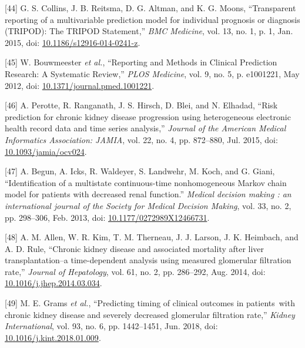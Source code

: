 \documentclass[12pt,PhD,twoside,openright]{muthesis}
\newenvironment{cslreferences}%
  {}%
  {\par}
\begin{document}
\begin{cslreferences}
\leavevmode\hypertarget{ref-collins_transparent_2015}{}%
{[}44{]} G. S. Collins, J. B. Reitsma, D. G. Altman, and K. G. Moons, ``Transparent reporting of a multivariable prediction model for individual prognosis or diagnosis (TRIPOD): The TRIPOD Statement,'' \emph{BMC Medicine}, vol. 13, no. 1, p. 1, Jan. 2015, doi: \href{https://doi.org/10.1186/s12916-014-0241-z}{10.1186/s12916-014-0241-z}.

\leavevmode\hypertarget{ref-bouwmeester_reporting_2012-1}{}%
{[}45{]} W. Bouwmeester \emph{et al.}, ``Reporting and Methods in Clinical Prediction Research: A Systematic Review,'' \emph{PLOS Medicine}, vol. 9, no. 5, p. e1001221, May 2012, doi: \href{https://doi.org/10.1371/journal.pmed.1001221}{10.1371/journal.pmed.1001221}.

\leavevmode\hypertarget{ref-perotte_risk_2015}{}%
{[}46{]} A. Perotte, R. Ranganath, J. S. Hirsch, D. Blei, and N. Elhadad, ``Risk prediction for chronic kidney disease progression using heterogeneous electronic health record data and time series analysis,'' \emph{Journal of the American Medical Informatics Association: JAMIA}, vol. 22, no. 4, pp. 872--880, Jul. 2015, doi: \href{https://doi.org/10.1093/jamia/ocv024}{10.1093/jamia/ocv024}.

\leavevmode\hypertarget{ref-begun_identification_2013}{}%
{[}47{]} A. Begun, A. Icks, R. Waldeyer, S. Landwehr, M. Koch, and G. Giani, ``Identification of a multistate continuous-time nonhomogeneous Markov chain model for patients with decreased renal function.'' \emph{Medical decision making : an international journal of the Society for Medical Decision Making}, vol. 33, no. 2, pp. 298--306, Feb. 2013, doi: \href{https://doi.org/10.1177/0272989X12466731}{10.1177/0272989X12466731}.

\leavevmode\hypertarget{ref-allen_chronic_2014}{}%
{[}48{]} A. M. Allen, W. R. Kim, T. M. Therneau, J. J. Larson, J. K. Heimbach, and A. D. Rule, ``Chronic kidney disease and associated mortality after liver transplantation--a time-dependent analysis using measured glomerular filtration rate,'' \emph{Journal of Hepatology}, vol. 61, no. 2, pp. 286--292, Aug. 2014, doi: \href{https://doi.org/10.1016/j.jhep.2014.03.034}{10.1016/j.jhep.2014.03.034}.

\leavevmode\hypertarget{ref-grams_predicting_2018}{}%
{[}49{]} M. E. Grams \emph{et al.}, ``Predicting timing of clinical outcomes in patients~with chronic kidney disease and severely decreased glomerular filtration rate,'' \emph{Kidney International}, vol. 93, no. 6, pp. 1442--1451, Jun. 2018, doi: \href{https://doi.org/10.1016/j.kint.2018.01.009}{10.1016/j.kint.2018.01.009}.


\end{cslreferences}
\end{document}

